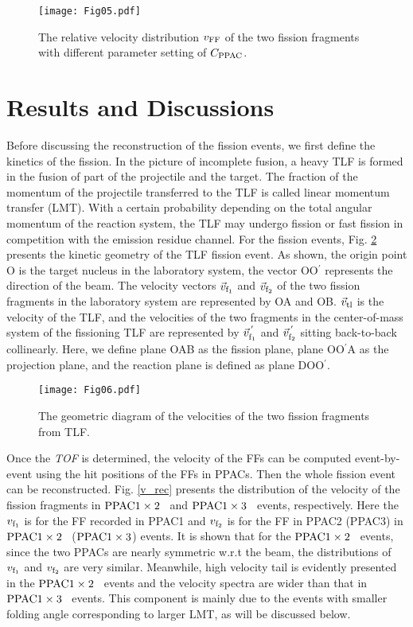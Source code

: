 \documentclass[submitting]{nst}
\def\pacab{${\rm PPAC 1\times 2}$}
\def\pacac{${\rm PPAC 1\times 3}$}
\begin{document}
\begin{figure}[!htb]
\texttt{[image: Fig05.pdf]}
\caption{The relative velocity distribution $v_{\rm FF}$  of the two fission fragments with different parameter setting of $C_{\rm PPAC}$.}
\label{t_const}
\end{figure}

\section{Results and Discussions}\label{sec.III}

Before discussing  the reconstruction of the fission events, we first define the kinetics of the fission. In the picture of incomplete fusion, a heavy TLF is formed in the fusion of part of the projectile and the target. The fraction of the  momentum of the projectile transferred to the TLF is called linear momentum transfer (LMT). With a certain probability depending on the  total angular momentum of the reaction system, the TLF may undergo fission or fast fission in competition with the emission residue channel. For the fission events, Fig. \ref{fission_vector} presents the kinetic geometry of the TLF fission event. As shown, the origin point O is the target nucleus in the laboratory system, the vector OO$^{'}$ represents the direction of the beam. The velocity vectors $\vec{v}_{\rm f_1}$ and $\vec{v}_{\rm f_2}$ of the two fission fragments in the laboratory system are represented by OA and OB.   $\vec{v}_{\rm tl}$ is the velocity of the TLF, and the velocities of the two fragments in the center-of-mass system of the fissioning TLF are represented by $\vec{v}^{\,'}_{\rm f_1}$ and $\vec{v}^{\,'}_{\rm f_2}$ sitting back-to-back collinearly. Here, we define plane OAB as the fission plane, plane OO$^{'}$A as the projection plane, and the reaction plane is defined as plane DOO$^{'}$.

\begin{figure}[!htb]
\texttt{[image: Fig06.pdf]}
\caption{The geometric diagram of the velocities of the two  fission fragments from TLF.}
\label{fission_vector}
\end{figure}

Once the  \textit{TOF} is determined, the velocity of the FFs can be computed event-by-event using the hit positions of the FFs in PPACs. Then the whole fission event can be reconstructed. Fig. \ref{v_rec} presents the distribution of the velocity of the fission fragments in \pacab~ and \pacac~ events, respectively.  Here the $v_{\rm f_1}$ is for the FF recorded in PPAC1 and   $v_{\rm f_2}$  is for the FF in PPAC2 (PPAC3) in \pacab~ (\pacac) events. It is shown that for the \pacab~ events, since the two PPACs are nearly symmetric w.r.t the beam, the distributions of  $v_{\rm f_1}$ and  $v_{\rm f_2}$ are very similar. Meanwhile,  high velocity tail is evidently presented  in the \pacab~ events and the velocity spectra are wider than that in \pacac~ events. This component is mainly due to the events with smaller folding angle corresponding to larger LMT, as will be discussed below. 
\end{document}
